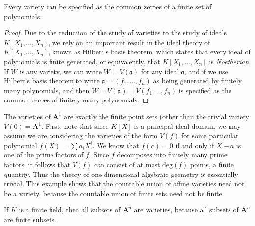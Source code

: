 \begin{prop}
    Every variety can be specified as the common zeroes of a finite set of polynomials.
\end{prop}
\begin{proof}
    Due to the reduction of the study of varieties to the study of ideals $K[X_1, \dots, X_n]$, we rely on an important result in the ideal theory of $K[X_1, \dots, X_n]$, known as Hilbert's basis theorem, which states that every ideal of polynomials is finite generated, or equivalently, that $K[X_1, \dots, X_n]$ is {\it Noetherian}. If $W$ is any variety, we can write $W = V(\mathfrak{a})$ for any ideal $\mathfrak{a}$, and if we use Hilbert's basis theorem to write $\mathfrak{a} = (f_1, \dots, f_n)$ as being generated by finitely many polynomials, and then $W = V(\mathfrak{a}) = V(f_1, \dots, f_n)$ is specified as the common zeroes of finitely many polynomials.
\end{proof}

\begin{example}
    The varieties of $\mathbf{A}^1$ are exactly the finite point sets (other than the trivial variety $V(0) = \mathbf{A}^1$. First, note that since $K[X]$ is a principal ideal domain, we may assume we are considering the varieties of the form $V(f)$ for some particular polynomial $f(X) = \sum a_i X^i$. We know that $f(a) = 0$ if and only if $X - a$ is one of the prime factors of $f$. Since $f$ decomposes into finitely many prime factors, it follows that $V(f)$ can consist of at most $\text{deg}(f)$ points, a finite quantity. Thus the theory of one dimensional algebraic geometry is essentially trivial. This example shows that the countable union of affine varieties need not be a variety, because the countable union of finite sets need not be finite.
\end{example}

\begin{example}
    If $K$ is a finite field, then all subsets of $\mathbf{A}^n$ are varieties, because all subsets of $\mathbf{A}^n$ are finite subsets.
\end{example}

